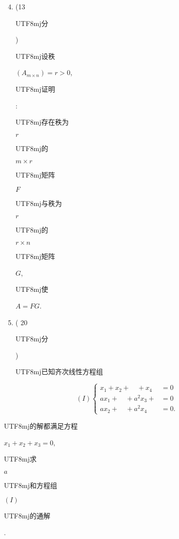 \documentclass[10pt]{article}
\begin{document}
\begin{enumerate}
  \setcounter{enumi}{3}
  \item (13 \begin{CJK}{UTF8}{mj}分\end{CJK}) \begin{CJK}{UTF8}{mj}设秩\end{CJK} $\left(A_{m \times n}\right)=r>0$, \begin{CJK}{UTF8}{mj}证明\end{CJK}: \begin{CJK}{UTF8}{mj}存在秩为\end{CJK} $r$ \begin{CJK}{UTF8}{mj}的\end{CJK} $m \times r$ \begin{CJK}{UTF8}{mj}矩阵\end{CJK} $F$ \begin{CJK}{UTF8}{mj}与秩为\end{CJK} $r$ \begin{CJK}{UTF8}{mj}的\end{CJK} $r \times n$ \begin{CJK}{UTF8}{mj}矩阵\end{CJK} $G$, \begin{CJK}{UTF8}{mj}使\end{CJK} $A=F G$.

  \item ( 20 \begin{CJK}{UTF8}{mj}分\end{CJK}) \begin{CJK}{UTF8}{mj}已知齐次线性方程组\end{CJK}

\end{enumerate}
$$
(I)\left\{\begin{aligned}
x_{1}+x_{2}+\quad+x_{4} &=0 \\
a x_{1}+\quad+a^{2} x_{3}+&=0 \\
a x_{2}+\quad+a^{2} x_{4} &=0 .
\end{aligned}\right.
$$
\begin{CJK}{UTF8}{mj}的解都满足方程\end{CJK} $x_{1}+x_{2}+x_{3}=0$, \begin{CJK}{UTF8}{mj}求\end{CJK} $a$ \begin{CJK}{UTF8}{mj}和方程组\end{CJK} $(I)$ \begin{CJK}{UTF8}{mj}的通解\end{CJK}.
\end{document}
